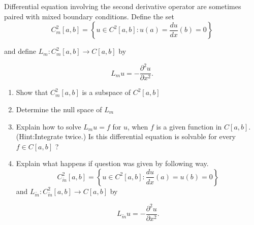 
Differential equation involving the second derivative operator are sometimes paired with mixed boundary conditions. Define the set 
\[ 
C_m^2[a,b]=\left\{ u \in C^2[a,b]: u(a)= \frac{du}{dx}(b)=0\right\}
\]

and define $L_m : C_m^2[a,b] \rightarrow C[a,b]$ by

\[
L_m u = -\frac{\partial^2 u}{\partial x^2}. 
\]
\begin{enumerate}
\item Show that $C_m^2[a,b]$ is a subspace of $C^2[a,b]$ 
\item Determine the null space of $L_m$
\item Explain how to solve $L_m u = f$ for $u$, when $f$ is a given function in $C[a,b]$. (Hint:Integrate twice.) Is this differential equation is solvable for every $f\in C[a,b]$ ?
\item Explain what happens if question was given by following way.
\[ 
C_{\tilde{m}}^2[a,b]=\left\{ u \in C^2[a,b]: \frac{du}{dx}(a)=u(b)=0\right\}
\]
and $L_{\tilde{m}} : C_{\tilde{m}}^2[a,b] \rightarrow C[a,b]$ by

\[
L_{\tilde{m}} u = -\frac{\partial^2 u}{\partial x^2}. 
\]

\end{enumerate}

 



